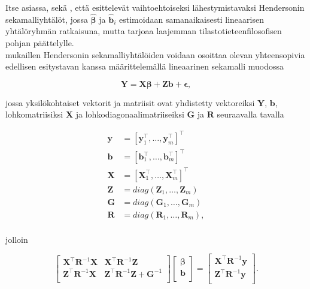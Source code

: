 \documentclass[finnish]{docopts}
\begin{document}
Itse asiassa, sekä \cite{nissinen09}, että \cite{verbeke00} esittelevät vaihtoehtoiseksi lähestymistavaksi Hendersonin sekamalliyhtälöt, jossa $\hat{\bm{\beta}}$ ja $\hat{\bm{b}}_i$ estimoidaan samanaikaisesti lineaarisen yhtälöryhmän ratkaisuna, mutta \cite{verbeke00} tarjoaa laajemman tilastotieteenfilosofisen pohjan päättelylle.\\

\cite{verbeke00} mukaillen Hendersonin sekamalliyhtälöiden voidaan osoittaa olevan yhteensopivia edellisen esitystavan kanssa määrittelemällä lineaarinen sekamalli muodossa

$$
\bm{Y} = \bm{X} \bm{\beta} + \bm{Z} \bm{b} + \bm{\epsilon},
$$

jossa yksilökohtaiset vektorit ja matriisit ovat yhdistetty vektoreiksi $\bm{Y}$, $\bm{b}$, lohkomatriisiksi $\bm{X}$ ja lohkodiagonaalimatriiseiksi $\bm{G}$ ja $\bm{R}$ seuraavalla tavalla

$$
\begin{aligned}
\bm{y} &= [\bm{y}_{1}^\top, \dots, \bm{y}_{m}^\top]^\top \\
\bm{b} &= [\bm{b}_{1}^\top, \dots, \bm{b}_{m}^\top]^\top \\
\bm{X} &= [\bm{X}_{1}^\top, \dots, \bm{X}_{m}^\top]^\top \\
\bm{Z} &= diag(\bm{Z}_{1}, \dots, \bm{Z}_{m}) \\
\bm{G} &= diag(\bm{G}_{1}, \dots, \bm{G}_{m}) \\
\bm{R} &= diag(\bm{R}_{1}, \dots, \bm{R}_{m}), \\
\end{aligned}
$$

jolloin

$$
\begin{bmatrix}
\bm{X}^\top \bm{R}^{-1} \bm{X} & \bm{X}^\top \bm{R}^{-1} \bm{Z} \\
\bm{Z}^\top \bm{R}^{-1} \bm{X} & \bm{Z}^\top \bm{R}^{-1} \bm{Z} + \bm{G}^{-1}\\
\end{bmatrix}
\begin{bmatrix}
\bm{\beta} \\
\bm{b}\\
\end{bmatrix}
=
\begin{bmatrix}
\bm{X}^\top \bm{R}^{-1} \bm{y} \\
\bm{Z}^\top \bm{R}^{-1} \bm{y}\\
\end{bmatrix}.
$$
\end{document}
